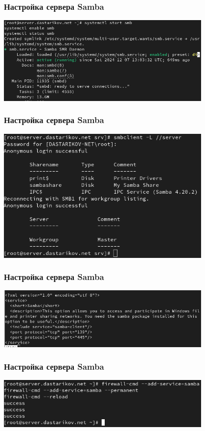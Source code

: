 \begin{frame}
\frametitle{Настройка сервера Samba}
    \includegraphics[width=0.8\textwidth]{../images/image03.png}
\end{frame}


\begin{frame}
\frametitle{Настройка сервера Samba}
    \includegraphics[width=0.8\textwidth]{../images/image16.png}
\end{frame}


\begin{frame}
\frametitle{Настройка сервера Samba}
    \includegraphics[width=0.8\textwidth]{../images/image04.png}
\end{frame}


\begin{frame}
\frametitle{Настройка сервера Samba}
    \includegraphics[width=0.8\textwidth]{../images/image05.png}
\end{frame}


